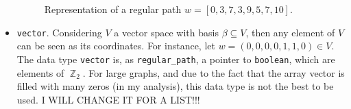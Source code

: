 \documentclass[11pt,a4paper]{article}
\DeclareMathOperator{\Z}{\mathbb{Z}}
\begin{document}
\begin{itemize}
\begin{figure}
			\caption{Representation of a regular path $w = [0,3,7,3,9,5,7,10]$.}
			\label{fig:regular_path}
		\end{figure}

	\item \texttt{vector}. Considering $V$ a vector space with basis $\beta \subseteq V$, then
		any element of $V$ can be seen as its coordinates. For instance,
		let $w = (0,0,0,0,1,1,0) \in V$. The data type \texttt{vector}
		is, as \texttt{regular\_path}, a pointer to \texttt{boolean},
		which are elements of $\Z_2$. 
		{\color{red} For large graphs, and due to the fact that the array
		vector is filled with many zeros (in my analysis), this data type is
		not the best to be used. I WILL CHANGE IT FOR  A LIST!!!}
\end{itemize}

\end{document}
